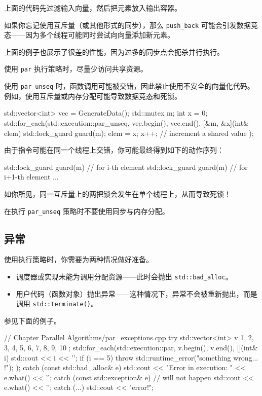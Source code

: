 上面的代码先过滤输入向量，然后把元素放入输出容器。

如果你忘记使用互斥量（或其他形式的同步），那么 \texttt{push\_back} 可能会引发数据竞态——因为多个线程可能同时尝试向向量添加新元素。

上面的例子也展示了很差的性能，因为过多的同步点会扼杀并行执行。

使用 \texttt{par} 执行策略时，尽量少访问共享资源。

使用 \texttt{par\_unseq} 时，函数调用可能被交错，因此禁止使用不安全的向量化代码。例如，使用互斥量或内存分配可能导致数据竞态和死锁。

\begin{codebox}[cpp]
std::vector<int> vec = GenerateData();
std::mutex m;
int x = 0;
std::for_each(std::execution::par_unseq, vec.begin(), vec.end(),
[&m, &x](int& elem) {
std::lock_guard guard(m);
elem = x;
x++; // increment a shared value
});
\end{codebox}

由于指令可能在同一个线程上交错，你可能最终得到如下的动作序列：

\begin{codebox}[cpp]
std::lock_guard guard(m) // for i-th element
std::lock_guard guard(m) // for i+1-th element
...
\end{codebox}

如你所见，同一互斥量上的两把锁会发生在单个线程上，从而导致死锁！

在执行 \texttt{par\_unseq} 策略时不要使用同步与内存分配。


\subsection{异常}

使用执行策略时，你需要为两种情况做好准备。
\begin{itemize}
\item 调度器或实现未能为调用分配资源——此时会抛出 \texttt{std::bad\_alloc}。
\item 用户代码（函数对象）抛出异常——这种情况下，异常不会被重新抛出，而是调用 \texttt{std::terminate()}。
\end{itemize}

参见下面的例子。

\begin{codebox}[cpp]
// Chapter Parallel Algorithms/par_exceptions.cpp
try
{
std::vector<int> v{ 1, 2, 3, 4, 5, 6, 7, 8, 9, 10 };
std::for_each(std::execution::par, v.begin(), v.end(),
[](int& i) {
std::cout << i << '\n';
if (i == 5)
throw std::runtime_error("something wrong... !");
});
}
catch (const std::bad_alloc& e)
{
std::cout << "Error in execution: " << e.what() << '\n';
}
catch (const std::exception& e) // will not happen
{
std::cout << e.what() << '\n';
}
catch (...)
{
std::cout << "error!\n";
}
\end{codebox}


